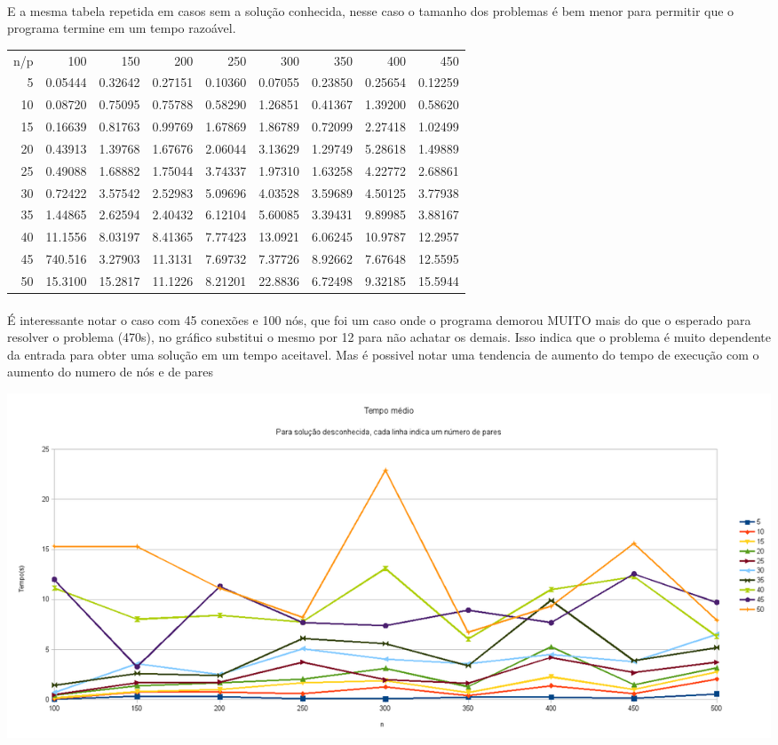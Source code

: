 \documentclass{article}
\begin{document}
\paragraph{} E a mesma tabela repetida em casos sem a solução
conhecida, nesse caso o tamanho dos problemas é bem menor para
permitir que o programa termine em um tempo razoável.
\begin{center}
\begin{tabular}{rrrrrrrrr}
n/p & 100 & 150 & 200 & 250 & 300 & 350 & 400 & 450 \\
5  & 0.05444 & 0.32642 & 0.27151 & 0.10360 & 0.07055 & 0.23850 & 0.25654 & 0.12259 \\
10 & 0.08720 & 0.75095 & 0.75788 & 0.58290 & 1.26851 & 0.41367 & 1.39200 & 0.58620\\
15 & 0.16639 & 0.81763 & 0.99769 & 1.67869 & 1.86789 & 0.72099 & 2.27418 & 1.02499\\
20 & 0.43913 & 1.39768 & 1.67676 & 2.06044 & 3.13629 & 1.29749 & 5.28618 & 1.49889\\
25 & 0.49088 & 1.68882 & 1.75044 & 3.74337 & 1.97310 & 1.63258 & 4.22772 & 2.68861\\
30 & 0.72422 & 3.57542 & 2.52983 & 5.09696 & 4.03528 & 3.59689 & 4.50125 & 3.77938\\
35 & 1.44865 & 2.62594 & 2.40432 & 6.12104 & 5.60085 & 3.39431 & 9.89985 & 3.88167\\
40 & 11.1556 & 8.03197 & 8.41365 & 7.77423 & 13.0921 & 6.06245 & 10.9787 & 12.2957\\
45 & 740.516 & 3.27903 & 11.3131 & 7.69732 & 7.37726 & 8.92662 & 7.67648 & 12.5595\\
50 & 15.3100 & 15.2817 & 11.1226 & 8.21201 & 22.8836 & 6.72498 & 9.32185 & 15.5944\\
\end{tabular}
\end{center}
\paragraph{} É interessante notar o caso com 45 conexões e 100 nós, que foi um
caso onde o programa demorou MUITO mais do que o esperado para
resolver o problema (470s), no gráfico substitui o mesmo por 12 para
não achatar os demais. Isso indica que o problema é muito dependente
da entrada para obter uma solução em um tempo aceitavel. Mas é
possivel notar uma tendencia de aumento do tempo de execução com o
aumento do numero de nós e de pares
\begin{center}
  \includegraphics[scale=0.35]{graphic_unknow}
  \end{center}
\end{document}
